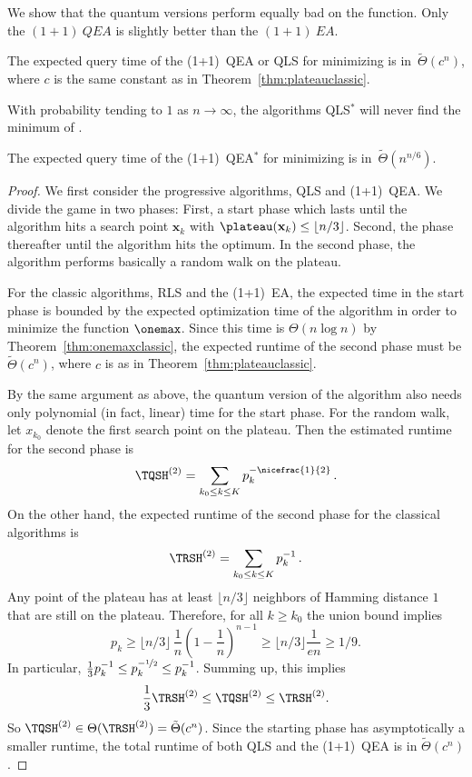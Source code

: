 We show that the quantum versions perform equally bad on the \plateau function. Only the $(1+1)~QEA$ is slightly better than the $(1+1)~EA$.
\begin{theorem}
The expected query time of the (1+1)~QEA or QLS for minimizing \plateau is in~$\tilde{\Theta}(c^n)$, where $c$ is the same constant as in Theorem~\ref{thm:plateauclassic}.

With probability tending to $1$ as $n \to \infty$, the algorithms QLS$^*$ will never find the minimum of \plateau.

The expected query time of the (1+1)~QEA$^*$ for minimizing \plateau is in~$\tilde{\Theta}(n^{n/6})$.
\end{theorem}

\begin{proof}
We first consider the progressive algorithms, QLS and (1+1)~QEA. We divide the game in two phases: First, a start phase which lasts until the algorithm hits a search point $\mathbf{x}_k$ with $\plateau(\mathbf{x}_k) \leq \lfloor n/3\rfloor$. Second, the phase thereafter until the algorithm hits the optimum. In the second phase, the algorithm performs basically a random walk on the plateau. 

For the classic algorithms, RLS and the (1+1)~EA, the expected time in the start phase is bounded by the expected optimization time of the algorithm in order to minimize the function $\onemax$. Since this time is $\Theta(n\log n)$ by Theorem~\ref{thm:onemaxclassic}, the expected runtime of the second phase must be $\tilde{\Theta}(c^n)$, where $c$ is as in Theorem~\ref{thm:plateauclassic}.

By the same argument as above, the quantum version of the algorithm also needs only polynomial (in fact, linear) time for the start phase. For the random walk, let $x_{k_0}$ denote the first search point on the plateau. Then the estimated runtime for the second phase is
\[
\TQSH^{(2)}=\sum_{k_0 \le k\le K}p_k^{-\nicefrac{1}{2}}\,.
\]
On the other hand, the expected runtime of the second phase for the classical algorithms is
\[
\TRSH^{(2)}=\sum_{k_0 \le k\le K}p_k^{-1}\,.
\]
Any point of the plateau has at least $\lfloor n/3\rfloor$ neighbors of Hamming distance $1$ that are still on the plateau. Therefore, for all $k\geq k_0$ the union bound implies
\[
p_k \ge \lfloor n/3\rfloor\, \frac{1}{n}\left(1-\frac{1}{n}\right)^{n-1} \geq \lfloor n/3\rfloor \frac{1}{en} \ge 1/9.
\]
In particular, $\frac{1}{3}p_k^{-1} \leq p_k^{-\nicefrac{1}{2}} \leq p_k^{-1}$. Summing up, this implies
\[
\frac{1}{3}\TRSH^{(2)} \le \TQSH^{(2)} \le \TRSH^{(2)}.
\]
So $\TQSH^{(2)} \in \Theta(\TRSH^{(2)}) = \tilde{\Theta}(c^n)$. Since the starting phase has asymptotically a smaller runtime, the total runtime of both QLS and the (1+1)~QEA is in $\tilde{\Theta}(c^n)$.\smallskip



\end{proof}
